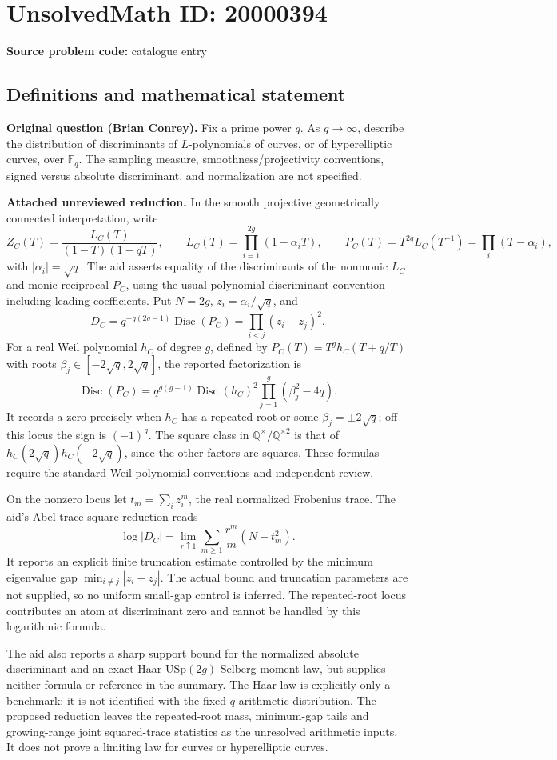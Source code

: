 \documentclass[11pt]{article}
\newcommand{\Q}{\mathbb{Q}}
\newcommand{\F}{\mathbb{F}}
\begin{document}
\section*{UnsolvedMath ID: 20000394}
\textbf{Source problem code:} catalogue entry
\subsection{Definitions and mathematical statement}
\textbf{Original question (Brian Conrey).} Fix a prime power $q$. As $g\to\infty$, describe the distribution of discriminants of $L$-polynomials of curves, or of hyperelliptic curves, over $\F_q$. The sampling measure, smoothness/projectivity conventions, signed versus absolute discriminant, and normalization are not specified.

\textbf{Attached unreviewed reduction.} In the smooth projective geometrically connected interpretation, write
\[Z_C(T)=\frac{L_C(T)}{(1-T)(1-qT)},\qquad L_C(T)=\prod_{i=1}^{2g}(1-\alpha_iT),\qquad P_C(T)=T^{2g}L_C(T^{-1})=\prod_i(T-\alpha_i),\]
with $|\alpha_i|=\sqrt q$. The aid asserts equality of the discriminants of the nonmonic $L_C$ and monic reciprocal $P_C$, using the usual polynomial-discriminant convention including leading coefficients. Put $N=2g$, $z_i=\alpha_i/\sqrt q$, and
\[D_C=q^{-g(2g-1)}\operatorname{Disc}(P_C)=\prod_{i<j}(z_i-z_j)^2.\]
For a real Weil polynomial $h_C$ of degree $g$, defined by $P_C(T)=T^gh_C(T+q/T)$ with roots $\beta_j\in[-2\sqrt q,2\sqrt q]$, the reported factorization is
\[\operatorname{Disc}(P_C)=q^{g(g-1)}\operatorname{Disc}(h_C)^2\prod_{j=1}^g(\beta_j^2-4q).\]
It records a zero precisely when $h_C$ has a repeated root or some $\beta_j=\pm2\sqrt q$; off this locus the sign is $(-1)^g$. The square class in $\Q^\times/\Q^{\times2}$ is that of $h_C(2\sqrt q)h_C(-2\sqrt q)$, since the other factors are squares. These formulas require the standard Weil-polynomial conventions and independent review.

On the nonzero locus let $t_m=\sum_i z_i^m$, the real normalized Frobenius trace. The aid's Abel trace-square reduction reads
\[\log|D_C|=\lim_{r\uparrow1}\sum_{m\ge1}\frac{r^m}{m}(N-t_m^2).\]
It reports an explicit finite truncation estimate controlled by the minimum eigenvalue gap $\min_{i\ne j}|z_i-z_j|$. The actual bound and truncation parameters are not supplied, so no uniform small-gap control is inferred. The repeated-root locus contributes an atom at discriminant zero and cannot be handled by this logarithmic formula.

The aid also reports a sharp support bound for the normalized absolute discriminant and an exact Haar-$\mathrm{USp}(2g)$ Selberg moment law, but supplies neither formula or reference in the summary. The Haar law is explicitly only a benchmark: it is not identified with the fixed-$q$ arithmetic distribution. The proposed reduction leaves the repeated-root mass, minimum-gap tails and growing-range joint squared-trace statistics as the unresolved arithmetic inputs. It does not prove a limiting law for curves or hyperelliptic curves.
\end{document}
